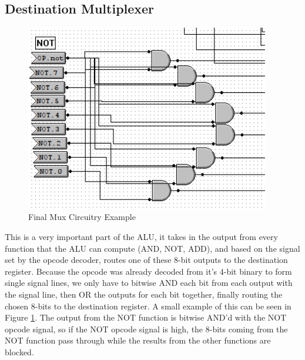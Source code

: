 \documentclass[a4paper,11pt]{article}
\begin{document}
\subsection{Destination Multiplexer}

   \begin{figure}
       \includegraphics[width=4.2in]{pictures/finalmux1}
     \caption{Final Mux Circuitry Example}
     \label{fig:finalmux1}
  \end{figure} 


This is a very important part of the ALU, it takes in the output from every function that the ALU can compute (AND, NOT, ADD), and based on the signal set by the opcode decoder, routes one of these 8-bit outputs to the destination register. Because the opcode was already decoded from it's 4-bit binary to form single signal lines, we only have to bitwise AND each bit from each output with the signal line, then OR the outputs for each bit together, finally routing the chosen 8-bits to the destination register. A small example of this can be seen in Figure \ref{fig:finalmux1}. The output from the NOT function is bitwise AND'd with the NOT opcode signal, so if the NOT opcode signal is high, the 8-bits coming from the NOT function pass through while the results from the other functions are blocked. 

\end{document}
